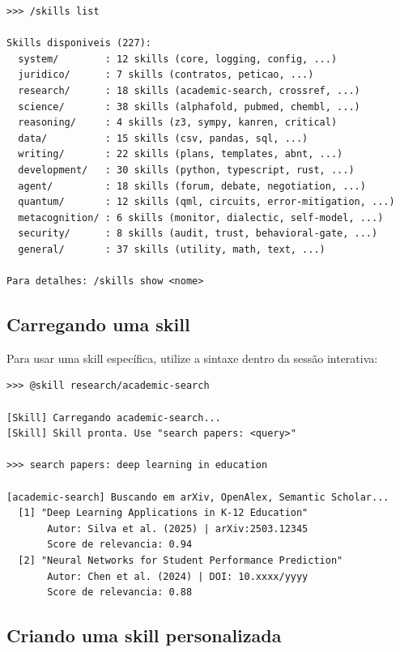 \begin{lstlisting}[style=bashstyle, caption={Listando skills disponíveis},
label={lst:list-skills}]
>>> /skills list

Skills disponiveis (227):
  system/        : 12 skills (core, logging, config, ...)
  juridico/      : 7 skills (contratos, peticao, ...)
  research/      : 18 skills (academic-search, crossref, ...)
  science/       : 38 skills (alphafold, pubmed, chembl, ...)
  reasoning/     : 4 skills (z3, sympy, kanren, critical)
  data/          : 15 skills (csv, pandas, sql, ...)
  writing/       : 22 skills (plans, templates, abnt, ...)
  development/   : 30 skills (python, typescript, rust, ...)
  agent/         : 18 skills (forum, debate, negotiation, ...)
  quantum/       : 12 skills (qml, circuits, error-mitigation, ...)
  metacognition/ : 6 skills (monitor, dialectic, self-model, ...)
  security/      : 8 skills (audit, trust, behavioral-gate, ...)
  general/       : 37 skills (utility, math, text, ...)

Para detalhes: /skills show <nome>
\end{lstlisting}

\subsection{Carregando uma skill}
\label{subsec:carregar-skill}

Para usar uma skill específica, utilize a sintaxe
 dentro da sessão interativa:

\begin{lstlisting}[style=bashstyle, caption={Carregando e usando uma skill},
label={lst:load-skill}]
>>> @skill research/academic-search

[Skill] Carregando academic-search...
[Skill] Skill pronta. Use "search papers: <query>"

>>> search papers: deep learning in education

[academic-search] Buscando em arXiv, OpenAlex, Semantic Scholar...
  [1] "Deep Learning Applications in K-12 Education"
       Autor: Silva et al. (2025) | arXiv:2503.12345
       Score de relevancia: 0.94
  [2] "Neural Networks for Student Performance Prediction"
       Autor: Chen et al. (2024) | DOI: 10.xxxx/yyyy
       Score de relevancia: 0.88
\end{lstlisting}

\subsection{Criando uma skill personalizada}
\label{subsec:criar-skill}

